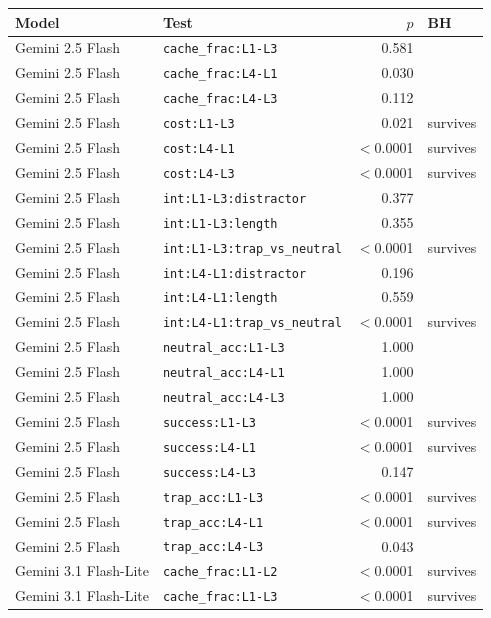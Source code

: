 \begin{longtable}{llrl}
\toprule
\textbf{Model} & \textbf{Test} & $p$ & \textbf{BH} \\
\midrule
\endhead
Gemini 2.5 Flash & \texttt{cache\_frac:L1-L3} & 0.581 &  \\
Gemini 2.5 Flash & \texttt{cache\_frac:L4-L1} & 0.030 &  \\
Gemini 2.5 Flash & \texttt{cache\_frac:L4-L3} & 0.112 &  \\
Gemini 2.5 Flash & \texttt{cost:L1-L3} & 0.021 & survives \\
Gemini 2.5 Flash & \texttt{cost:L4-L1} & $<$0.0001 & survives \\
Gemini 2.5 Flash & \texttt{cost:L4-L3} & $<$0.0001 & survives \\
Gemini 2.5 Flash & \texttt{int:L1-L3:distractor} & 0.377 &  \\
Gemini 2.5 Flash & \texttt{int:L1-L3:length} & 0.355 &  \\
Gemini 2.5 Flash & \texttt{int:L1-L3:trap\_vs\_neutral} & $<$0.0001 & survives \\
Gemini 2.5 Flash & \texttt{int:L4-L1:distractor} & 0.196 &  \\
Gemini 2.5 Flash & \texttt{int:L4-L1:length} & 0.559 &  \\
Gemini 2.5 Flash & \texttt{int:L4-L1:trap\_vs\_neutral} & $<$0.0001 & survives \\
Gemini 2.5 Flash & \texttt{neutral\_acc:L1-L3} & 1.000 &  \\
Gemini 2.5 Flash & \texttt{neutral\_acc:L4-L1} & 1.000 &  \\
Gemini 2.5 Flash & \texttt{neutral\_acc:L4-L3} & 1.000 &  \\
Gemini 2.5 Flash & \texttt{success:L1-L3} & $<$0.0001 & survives \\
Gemini 2.5 Flash & \texttt{success:L4-L1} & $<$0.0001 & survives \\
Gemini 2.5 Flash & \texttt{success:L4-L3} & 0.147 &  \\
Gemini 2.5 Flash & \texttt{trap\_acc:L1-L3} & $<$0.0001 & survives \\
Gemini 2.5 Flash & \texttt{trap\_acc:L4-L1} & $<$0.0001 & survives \\
Gemini 2.5 Flash & \texttt{trap\_acc:L4-L3} & 0.043 &  \\
Gemini 3.1 Flash-Lite & \texttt{cache\_frac:L1-L2} & $<$0.0001 & survives \\
Gemini 3.1 Flash-Lite & \texttt{cache\_frac:L1-L3} & $<$0.0001 & survives \\

\end{longtable}
